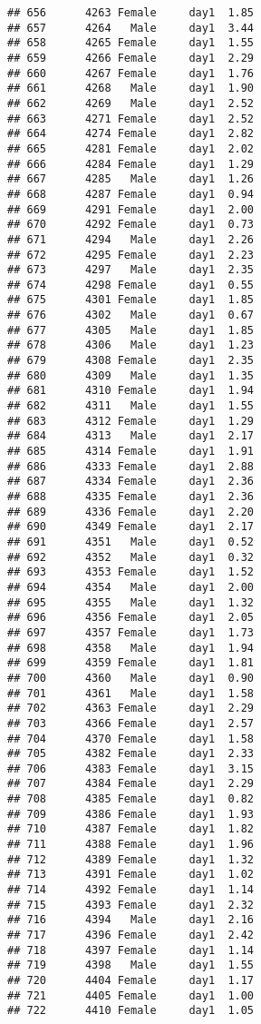 \documentclass[
]{article}
\begin{document}
\begin{verbatim}
## 656      4263 Female     day1  1.85
## 657      4264   Male     day1  3.44
## 658      4265 Female     day1  1.55
## 659      4266 Female     day1  2.29
## 660      4267 Female     day1  1.76
## 661      4268   Male     day1  1.90
## 662      4269   Male     day1  2.52
## 663      4271 Female     day1  2.52
## 664      4274 Female     day1  2.82
## 665      4281 Female     day1  2.02
## 666      4284 Female     day1  1.29
## 667      4285   Male     day1  1.26
## 668      4287 Female     day1  0.94
## 669      4291 Female     day1  2.00
## 670      4292 Female     day1  0.73
## 671      4294   Male     day1  2.26
## 672      4295 Female     day1  2.23
## 673      4297   Male     day1  2.35
## 674      4298 Female     day1  0.55
## 675      4301 Female     day1  1.85
## 676      4302   Male     day1  0.67
## 677      4305   Male     day1  1.85
## 678      4306   Male     day1  1.23
## 679      4308 Female     day1  2.35
## 680      4309   Male     day1  1.35
## 681      4310 Female     day1  1.94
## 682      4311   Male     day1  1.55
## 683      4312 Female     day1  1.29
## 684      4313   Male     day1  2.17
## 685      4314 Female     day1  1.91
## 686      4333 Female     day1  2.88
## 687      4334 Female     day1  2.36
## 688      4335 Female     day1  2.36
## 689      4336 Female     day1  2.20
## 690      4349 Female     day1  2.17
## 691      4351   Male     day1  0.52
## 692      4352   Male     day1  0.32
## 693      4353 Female     day1  1.52
## 694      4354   Male     day1  2.00
## 695      4355   Male     day1  1.32
## 696      4356 Female     day1  2.05
## 697      4357 Female     day1  1.73
## 698      4358   Male     day1  1.94
## 699      4359 Female     day1  1.81
## 700      4360   Male     day1  0.90
## 701      4361   Male     day1  1.58
## 702      4363 Female     day1  2.29
## 703      4366 Female     day1  2.57
## 704      4370 Female     day1  1.58
## 705      4382 Female     day1  2.33
## 706      4383 Female     day1  3.15
## 707      4384 Female     day1  2.29
## 708      4385 Female     day1  0.82
## 709      4386 Female     day1  1.93
## 710      4387 Female     day1  1.82
## 711      4388 Female     day1  1.96
## 712      4389 Female     day1  1.32
## 713      4391 Female     day1  1.02
## 714      4392 Female     day1  1.14
## 715      4393 Female     day1  2.32
## 716      4394   Male     day1  2.16
## 717      4396 Female     day1  2.42
## 718      4397 Female     day1  1.14
## 719      4398   Male     day1  1.55
## 720      4404 Female     day1  1.17
## 721      4405 Female     day1  1.00
## 722      4410 Female     day1  1.05

\end{verbatim}
\end{document}

